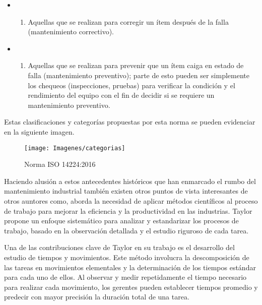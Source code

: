 \documentclass[
  11pt,
  bookmarksnumbered]{article}
\providecommand{\tightlist}{%
  \setlength{\itemsep}{0pt}\setlength{\parskip}{0pt}}
\begin{document}
\begin{itemize}
\item
  \begin{enumerate}
  \def\labelenumi{\alph{enumi})}
  \tightlist
  \item
    Aquellas que se realizan para corregir un ítem después de la falla (mantenimiento correctivo).
  \end{enumerate}
\item
  \begin{enumerate}
  \def\labelenumi{\alph{enumi})}
  \setcounter{enumi}{1}
  \tightlist
  \item
    Aquellas que se realizan para prevenir que un ítem caiga en estado de falla (mantenimiento preventivo); parte de esto pueden ser simplemente los chequeos (inspecciones, pruebas) para verificar la condición y el rendimiento del equipo con el fin de decidir si se requiere un mantenimiento preventivo.
  \end{enumerate}
\end{itemize}

Estas clasificaciones y categorías propuestas por esta norma se pueden evidenciar en la siguiente imagen.

\begin{figure}

{\centering \texttt{[image: Imagenes/categorias]} 

}

\caption{Norma ISO 14224:2016}\label{fig:unnamed-chunk-2}
\end{figure}

Haciendo alusión a estos antecedentes históricos que han enmarcado el rumbo del mantenimiento industrial también existen otros puntos de vista interesantes de otros auntores como, \textcite{taylor1911principles} aborda la necesidad de aplicar métodos científicos al proceso de trabajo para mejorar la eficiencia y la productividad en las industrias.
Taylor propone un enfoque sistemático para analizar y estandarizar los procesos de trabajo, basado en la observación detallada y el estudio riguroso de cada tarea.

Una de las contribuciones clave de Taylor en su trabajo es el desarrollo del estudio de tiempos y movimientos.
Este método involucra la descomposición de las tareas en movimientos elementales y la determinación de los tiempos estándar para cada uno de ellos.
Al observar y medir repetidamente el tiempo necesario para realizar cada movimiento, los gerentes pueden establecer tiempos promedio y predecir con mayor precisión la duración total de una tarea.
\end{document}
